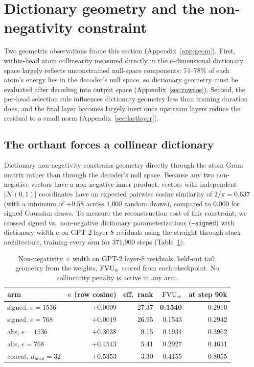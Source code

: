 \section{Dictionary geometry and the non-negativity constraint}
\label{sec:geom}

Two geometric observations frame this section (Appendix~\ref{app:geom}).
First, within-head atom collinearity measured directly in the
$e$-dimensional dictionary space largely reflects unconstrained null-space
components: 74--78\% of each atom's energy lies in the decoder's null space,
so dictionary geometry must be evaluated after decoding into output space
(Appendix~\ref{sec:rowcos}). Second, the per-head selection rule influences
dictionary geometry less than training duration does, and the final layer
becomes largely inert once upstream layers reduce the residual to a small
norm (Appendix~\ref{sec:lastlayer}).

\subsection{The orthant forces a collinear dictionary}
\label{sec:gpt2}

Dictionary non-negativity constrains geometry directly through the atom Gram
matrix rather than through the decoder's null space. Because any two
non-negative vectors have a non-negative inner product, vectors with
independent $\lvert\mathcal{N}(0,1)\rvert$ coordinates have an expected
pairwise cosine similarity of $2/\pi = 0.637$ (with a minimum of $+0.58$
across 4{,}000 random draws), compared to $0.000$ for signed Gaussian draws.
To measure the reconstruction cost of this constraint, we crossed signed vs.\
non-negative dictionary parameterizations (\texttt{--signed}) with
dictionary width $e$ on GPT-2 layer-8 residuals using the straight-through
stack architecture, training every arm for 371{,}900 steps
(Table~\ref{tab:orthant}).

\begin{table}[htbp]\centering\small
\begin{tabular}{@{}lrrrr@{}}
\toprule
arm & $\bar\kappa$ (row cosine) & eff.\ rank & $\mathrm{FVU}_w$ & at step 90k \\
\midrule
signed, $e{=}1536$ & $+0.0009$ & 27.37 & \textbf{0.1540} & 0.2910 \\
signed, $e{=}768$  & $+0.0019$ & 26.95 & 0.1543 & 0.2942 \\
abs, $e{=}1536$    & $+0.3038$ &  9.15 & 0.1934 & 0.3962 \\
abs, $e{=}768$     & $+0.4543$ &  5.41 & 0.2927 & 0.4631 \\
concat, $d_{\mathrm{head}}{=}32$ & $+0.5353$ & 3.30 & 0.4155 & 0.8055 \\
\bottomrule
\end{tabular}
\caption{Non-negativity $\times$ width on GPT-2 layer-8 residuals,
held-out tail: geometry from the weights, $\mathrm{FVU}_w$ scored from each
checkpoint. No collinearity penalty is active in any arm.}
\label{tab:orthant}
\end{table}

